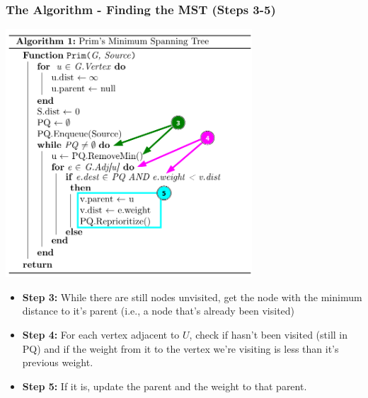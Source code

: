 \documentclass{beamer}
\begin{document}
\begin{frame}[fragile]
    \frametitle{The Algorithm - Finding the MST (Steps 3-5)}
    \centering
    \begin{minipage}{0.69\textwidth}
        \includegraphics[width=0.69\textwidth]{./imgs/prims-3-4-5.png}
    \end{minipage}
    \hspace{-3cm}
    \begin{minipage}{0.49\textwidth}
        \small
        \begin{itemize}
            \item \textbf{Step 3:} While there are still nodes unvisited, get the node with the minimum distance to it's parent (i.e., a node that's already been visited)
            \item \textbf{Step 4:} For each vertex adjacent to $U$, check if hasn't been visited (still in PQ) and if the weight from it to the vertex we're visiting is less than it's previous weight.
            \item \textbf{Step 5:} If it is, update the parent and the weight to that parent.
        \end{itemize}
    \end{minipage}
\end{frame}
\end{document}
